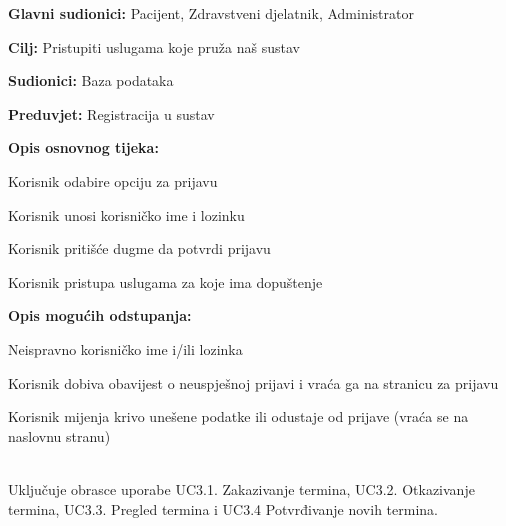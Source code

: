 \noindent {}
\begin{packed_item}
	
	\item \textbf{Glavni sudionici: }Pacijent, Zdravstveni djelatnik, Administrator
	\item  \textbf{Cilj:} Pristupiti uslugama koje pruža naš sustav
	\item  \textbf{Sudionici:} Baza podataka
	\item  \textbf{Preduvjet:} Registracija u sustav
	\item  \textbf{Opis osnovnog tijeka:}
	
	\item[] \begin{packed_enum}
		
		\item Korisnik odabire opciju za prijavu
		\item Korisnik unosi korisničko ime i lozinku
		\item Korisnik pritišće dugme da potvrdi prijavu
		\item Korisnik pristupa uslugama za koje ima dopuštenje 
	\end{packed_enum}
	
	\item  \textbf{Opis mogućih odstupanja:}
	
	\item[] \begin{packed_item}
		
		\item[2.a] Neispravno korisničko ime i/ili lozinka
		\item[] \begin{packed_enum}
			
			\item Korisnik dobiva obavijest o neuspješnoj prijavi i vraća ga na stranicu za prijavu
			\item Korisnik mijenja krivo unešene podatke ili odustaje od prijave (vraća se na naslovnu stranu)
			
		\end{packed_enum}
		
	\end{packed_item}
\end{packed_item}

\noindent {}\\
Uključuje obrasce uporabe UC3.1. Zakazivanje termina, UC3.2. Otkazivanje termina, UC3.3. Pregled termina i UC3.4 Potvrđivanje novih termina.\\


